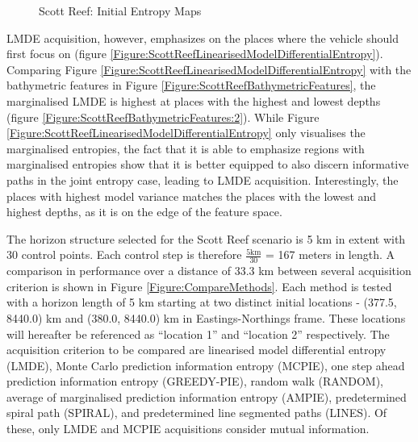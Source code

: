 			\begin{figure}[!htbp]
			\centering
			\caption{Scott Reef: Initial Entropy Maps}
			\label{Figure:InitialEntropyMaps}
			\end{figure}
			
			LMDE acquisition, however, emphasizes on the places where the vehicle should first focus on (figure \ref{Figure:ScottReefLinearisedModelDifferentialEntropy}). Comparing Figure \ref{Figure:ScottReefLinearisedModelDifferentialEntropy} with the bathymetric features in Figure \ref{Figure:ScottReefBathymetricFeatures}, the marginalised LMDE is highest at places with the highest and lowest depths (figure \ref{Figure:ScottReefBathymetricFeatures:2}). While Figure \ref{Figure:ScottReefLinearisedModelDifferentialEntropy} only visualises the marginalised entropies, the fact that it is able to emphasize regions with marginalised entropies show that it is better equipped to also discern informative paths in the joint entropy case, leading to LMDE acquisition. Interestingly, the places with highest model variance matches the places with the lowest and highest depths, as it is on the edge of the feature space.
		
			The horizon structure selected for the Scott Reef scenario is 5 km in extent with 30 control points. Each control step is therefore $\frac{5 \mathrm{km}}{30}$ = 167 meters in length.  A comparison in performance over a distance of 33.3 km between several acquisition criterion is shown in Figure \ref{Figure:CompareMethods}. Each method is tested with a horizon length of 5 km starting at two distinct initial locations - (377.5, 8440.0) km and (380.0, 8440.0) km in Eastings-Northings frame. These locations will hereafter be referenced as ``location 1'' and ``location 2'' respectively. The acquisition criterion to be compared are linearised model differential entropy (LMDE), Monte Carlo prediction information entropy (MCPIE), one step ahead prediction information entropy (GREEDY-PIE), random walk (RANDOM), average of marginalised prediction information entropy (AMPIE), predetermined spiral path (SPIRAL), and predetermined line segmented paths (LINES). Of these, only LMDE and MCPIE acquisitions consider mutual information.
		
